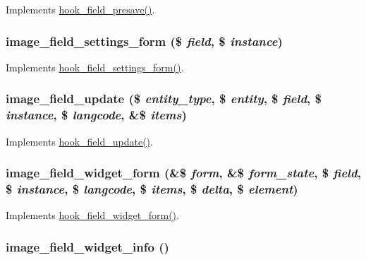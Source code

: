 \label{image_8field_8inc_a6bbe53bf7c5f4bd0a98bc61557ef861b}
Implements \hyperlink{group__field__types_ga5ab3a9e3c8ebccb8ca151790ec07809d}{hook\_\-field\_\-presave()}. \hypertarget{image_8field_8inc_a8ddb2762346a881f257c44aab5bda13e}{
\subsubsection[{image\_\-field\_\-settings\_\-form}]{\setlength{\rightskip}{0pt plus 5cm}image\_\-field\_\-settings\_\-form (\$ {\em field}, \/  \$ {\em instance})}}
\label{image_8field_8inc_a8ddb2762346a881f257c44aab5bda13e}
Implements \hyperlink{group__field__types_gab8a2ed808857cc6f3cb661fbc99d30d4}{hook\_\-field\_\-settings\_\-form()}. \hypertarget{image_8field_8inc_ab293134daf1be482d495dba9b93e2335}{
\subsubsection[{image\_\-field\_\-update}]{\setlength{\rightskip}{0pt plus 5cm}image\_\-field\_\-update (\$ {\em entity\_\-type}, \/  \$ {\em entity}, \/  \$ {\em field}, \/  \$ {\em instance}, \/  \$ {\em langcode}, \/  \&\$ {\em items})}}
\label{image_8field_8inc_ab293134daf1be482d495dba9b93e2335}
Implements \hyperlink{group__field__types_gaca5bc4f8ab69818f23783af24454d9c4}{hook\_\-field\_\-update()}. \hypertarget{image_8field_8inc_a31362f53c0480c28ab23092a49c329d8}{
\subsubsection[{image\_\-field\_\-widget\_\-form}]{\setlength{\rightskip}{0pt plus 5cm}image\_\-field\_\-widget\_\-form (\&\$ {\em form}, \/  \&\$ {\em form\_\-state}, \/  \$ {\em field}, \/  \$ {\em instance}, \/  \$ {\em langcode}, \/  \$ {\em items}, \/  \$ {\em delta}, \/  \$ {\em element})}}
\label{image_8field_8inc_a31362f53c0480c28ab23092a49c329d8}
Implements \hyperlink{group__field__widget_gaa9b0e55fd0eb57ac0f9c7c30d251971b}{hook\_\-field\_\-widget\_\-form()}. \hypertarget{image_8field_8inc_a6ec5a26a8e2fcb61f177cccbe5e4e9a0}{
\subsubsection[{image\_\-field\_\-widget\_\-info}]{\setlength{\rightskip}{0pt plus 5cm}image\_\-field\_\-widget\_\-info ()}}
